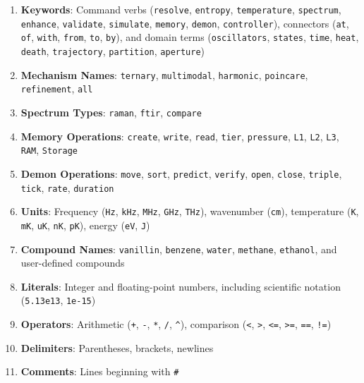 \documentclass[twocolumn,10pt]{article}
\begin{document}
\begin{enumerate}
    \item \textbf{Keywords}: Command verbs (\texttt{resolve}, \texttt{entropy}, \texttt{temperature}, \texttt{spectrum}, \texttt{enhance}, \texttt{validate}, \texttt{simulate}, \texttt{memory}, \texttt{demon}, \texttt{controller}), connectors (\texttt{at}, \texttt{of}, \texttt{with}, \texttt{from}, \texttt{to}, \texttt{by}), and domain terms (\texttt{oscillators}, \texttt{states}, \texttt{time}, \texttt{heat}, \texttt{death}, \texttt{trajectory}, \texttt{partition}, \texttt{aperture})

    \item \textbf{Mechanism Names}: \texttt{ternary}, \texttt{multimodal}, \texttt{harmonic}, \texttt{poincare}, \texttt{refinement}, \texttt{all}

    \item \textbf{Spectrum Types}: \texttt{raman}, \texttt{ftir}, \texttt{compare}

    \item \textbf{Memory Operations}: \texttt{create}, \texttt{write}, \texttt{read}, \texttt{tier}, \texttt{pressure}, \texttt{L1}, \texttt{L2}, \texttt{L3}, \texttt{RAM}, \texttt{Storage}

    \item \textbf{Demon Operations}: \texttt{move}, \texttt{sort}, \texttt{predict}, \texttt{verify}, \texttt{open}, \texttt{close}, \texttt{triple}, \texttt{tick}, \texttt{rate}, \texttt{duration}

    \item \textbf{Units}: Frequency (\texttt{Hz}, \texttt{kHz}, \texttt{MHz}, \texttt{GHz}, \texttt{THz}), wavenumber (\texttt{cm}), temperature (\texttt{K}, \texttt{mK}, \texttt{uK}, \texttt{nK}, \texttt{pK}), energy (\texttt{eV}, \texttt{J})

    \item \textbf{Compound Names}: \texttt{vanillin}, \texttt{benzene}, \texttt{water}, \texttt{methane}, \texttt{ethanol}, and user-defined compounds

    \item \textbf{Literals}: Integer and floating-point numbers, including scientific notation (\texttt{5.13e13}, \texttt{1e-15})

    \item \textbf{Operators}: Arithmetic (\texttt{+}, \texttt{-}, \texttt{*}, \texttt{/}, \texttt{\^{}}), comparison (\texttt{<}, \texttt{>}, \texttt{<=}, \texttt{>=}, \texttt{==}, \texttt{!=})

    \item \textbf{Delimiters}: Parentheses, brackets, newlines

    \item \textbf{Comments}: Lines beginning with \texttt{\#}
\end{enumerate}
\end{document}
